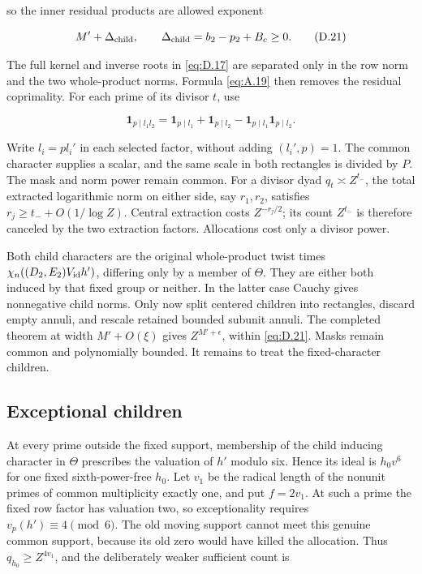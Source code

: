 \documentclass[11pt,a4paper]{article}
\begin{document}
so the inner residual products are allowed exponent

\[
M'+\Delta_{\rm child},\qquad \Delta_{\rm child}=b_2-p_2+B_c\ge0.
\tag{D.21}\label{eq:D.21}
\]

The full kernel and inverse roots in \eqref{eq:D.17} are separated only in the row norm and the two whole-product norms. Formula \eqref{eq:A.19} then removes the residual coprimality. For each prime of its divisor \(t\), use

\[
\mathbf1_{p\mid l_1l_2}=\mathbf1_{p\mid l_1}+\mathbf1_{p\mid l_2}
-\mathbf1_{p\mid l_1}\mathbf1_{p\mid l_2}.
\tag{D.22}\label{eq:D.22}
\]

Write \(l_i=pl_i'\) in each selected factor, without adding \((l_i',p)=1\). The common character supplies a scalar, and the same scale in both rectangles is divided by \(P\). The mask and norm power remain common. For a divisor dyad \(q_t\asymp Z^{t_-}\), the total extracted logarithmic norm on either side, say \(r_1,r_2\), satisfies \(r_j\ge t_-+O(1/\log Z)\). Central extraction costs \(Z^{-r_j/2}\); its count \(Z^{t_-}\) is therefore canceled by the two extraction factors. Allocations cost only a divisor power.

Both child characters are the original whole-product twist times \(\chi_n((D_2,E_2)V_{\rm id}h')\), differing only by a member of \(\Theta\). They are either both induced by that fixed group or neither. In the latter case Cauchy gives nonnegative child norms. Only now split centered children into rectangles, discard empty annuli, and rescale retained bounded subunit annuli. The completed theorem at width \(M'+O(\xi)\) gives \(Z^{M'+\epsilon}\), within \eqref{eq:D.21}. Masks remain common and polynomially bounded. It remains to treat the fixed-character children.

\subsection{Exceptional children}\label{sec:D.6}

At every prime outside the fixed support, membership of the child inducing character in \(\Theta\) prescribes the valuation of \(h'\) modulo six. Hence its ideal is \(h_0v^6\) for one fixed sixth-power-free \(h_0\). Let \(v_1\) be the radical length of the nonunit primes of common multiplicity exactly one, and put \(f=2v_1\). At such a prime the fixed row factor has valuation two, so exceptionality requires \(v_p(h')\equiv4\pmod6\). The old moving support cannot meet this genuine common support, because its old zero would have killed the allocation. Thus \(q_{h_0}\ge Z^{4v_1}\), and the deliberately weaker sufficient count is
\end{document}
